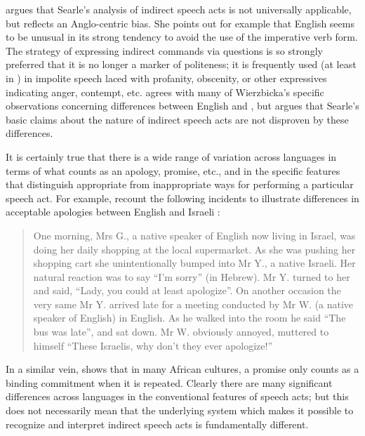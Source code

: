 \citet{Wierzbicka1985} argues that Searle’s analysis of indirect speech acts is not universally applicable, but reflects an Anglo-centric bias. She points out for example that English seems to be unusual in its strong tendency to avoid the use of the imperative verb form. The strategy of expressing indirect commands via questions is so strongly preferred that it is no longer a marker of politeness; it is frequently used (at least in ) in impolite speech laced with profanity, obscenity, or other expressives indicating anger, contempt, etc. \citet{Kalisz1992} agrees with many of Wierzbicka’s specific observations concerning differences between English and , but argues that Searle’s basic claims about the nature of indirect speech acts are not disproven by these differences.


It is certainly true that there is a wide range of variation across languages in terms of what counts as an apology, promise, etc., and in the specific features that distinguish appropriate from inappropriate ways for performing a particular speech act. For example, \citet{OlshtainCohen1989} recount the following incidents to illustrate differences in acceptable apologies between English and Israeli :


\begin{quote}
One morning, Mrs G., a native speaker of English now living in Israel, was doing her daily shopping at the local supermarket. As she was pushing her shopping cart she unintentionally bumped into Mr Y., a native Israeli. Her natural reaction was to say “I’m sorry” (in  {Hebrew}). Mr Y. turned to her and said, “Lady, you could at least apologize”. On another occasion the very same Mr Y. arrived late for a meeting conducted by Mr W. (a native speaker of English) in English. As he walked into the room he said “The bus was late”, and sat down. Mr W. obviously annoyed, muttered to himself “These Israelis, why don’t they ever apologize!”\hfill\citep[53]{OlshtainCohen1989}\hbox{}
\end{quote}


In a similar vein, \citet{Egner2002} shows that in many African cultures, a promise only counts as a binding commitment when it is repeated. Clearly there are many significant differences across languages in the conventional features of speech acts; but this does not necessarily mean that the underlying system which makes it possible to recognize and interpret indirect speech acts is fundamentally different.




